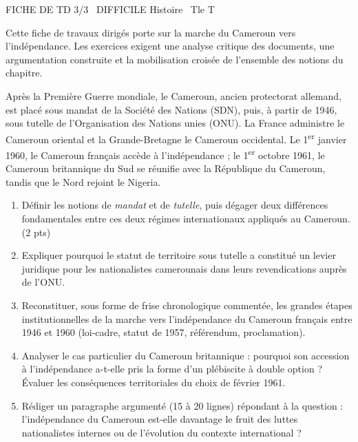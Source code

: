 \documentclass[11pt]{article}
\begin{document}
\begin{tcolorbox}[enhanced,colback=popink,colframe=popink,arc=10pt,boxrule=0pt,left=12pt,right=12pt,top=9pt,bottom=9pt]
{\color{white}\popxbold\small FICHE DE TD 3/3 \textbullet\ DIFFICILE \hfill Histoire \textbullet\ Tle T\par}
\end{tcolorbox}
\vspace{4pt}
Cette fiche de travaux dirigés porte sur la marche du Cameroun vers l'indépendance. Les exercices exigent une analyse critique des documents, une argumentation construite et la mobilisation croisée de l'ensemble des notions du chapitre.

\begin{exercice}
Après la Première Guerre mondiale, le Cameroun, ancien protectorat allemand, est placé sous mandat de la Société des Nations (SDN), puis, à partir de 1946, sous tutelle de l'Organisation des Nations unies (ONU). La France administre le Cameroun oriental et la Grande-Bretagne le Cameroun occidental. Le 1\textsuperscript{er} janvier 1960, le Cameroun français accède à l'indépendance ; le 1\textsuperscript{er} octobre 1961, le Cameroun britannique du Sud se réunifie avec la République du Cameroun, tandis que le Nord rejoint le Nigeria.
\begin{enumerate}
\item Définir les notions de \emph{mandat} et de \emph{tutelle}, puis dégager deux différences fondamentales entre ces deux régimes internationaux appliqués au Cameroun. (2 pts)
\item Expliquer pourquoi le statut de territoire sous tutelle a constitué un levier juridique pour les nationalistes camerounais dans leurs revendications auprès de l'ONU.
\item Reconstituer, sous forme de frise chronologique commentée, les grandes étapes institutionnelles de la marche vers l'indépendance du Cameroun français entre 1946 et 1960 (loi-cadre, statut de 1957, référendum, proclamation).
\item Analyser le cas particulier du Cameroun britannique : pourquoi son accession à l'indépendance a-t-elle pris la forme d'un plébiscite à double option ? Évaluer les conséquences territoriales du choix de février 1961.
\item Rédiger un paragraphe argumenté (15 à 20 lignes) répondant à la question : l'indépendance du Cameroun est-elle davantage le fruit des luttes nationalistes internes ou de l'évolution du contexte international ?
\end{enumerate}
\end{exercice}
\end{document}
